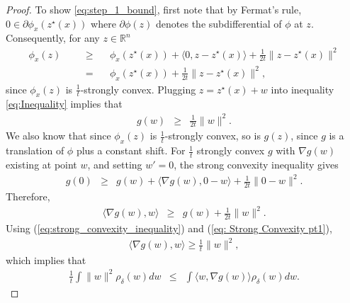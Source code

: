 \documentclass{article}
\newcommand{\Real}{\mathbb{R}}
\newcommand{\amp}{\mathop{\:\:\,}\nolimits}
\theoremstyle{plain}
\theoremstyle{definition}
\theoremstyle{remark}
\begin{document}
\begin{proof}
To show \eqref{eq:step_1_bound}, first note that by Fermat's rule, $0 \in \partial\phi_x(z^\star(x))$ where $\partial \phi(z)$ denotes the subdifferential of $\phi$ at $z$.
Consequently, for any $z \in \Real^n$
\begin{equation}
\label{eq:Inequality}
\begin{split}
    \phi_x(z) & \amp \geq \amp  \phi_x(z^\star(x)) + \langle 0, z - z^\star(x)\rangle + \frac{1}{2t}\|z-z^\star(x)\|^2 \\
    & \amp = \amp \phi_x(z^\star(x)) + \frac{1}{2t}\|z-z^\star(x)\|^2,
\end{split}
\end{equation}
since $\phi_x(z)$ is $\frac{1}{t}$-strongly convex. Plugging $z = z^\star(x) + w$ into inequality \eqref{eq:Inequality} implies that
\begin{eqnarray}
\label{eq:strong_convexity_inequality}
g(w) & \geq & \frac{1}{2t}\lVert w \rVert^2.
\end{eqnarray}
We also know that since $\phi_x(z)$ is $\frac{1}{t}$-strongly convex, so is $g(z)$, since $g$ is a translation of $\phi$ plus a constant shift. For $\frac{1}{t}$ strongly convex $g$ with $\nabla g(w)$ existing at point $w$, and setting $w' = 0$, the strong convexity inequality gives
\begin{eqnarray}
    g(0) & \geq &  g(w) + \langle \nabla g(w), 0 - w\rangle + \frac{1}{2t}\|0-w\|^2.
\end{eqnarray}
Therefore, 
\begin{eqnarray}\label{eq: Strong Convexity pt1}
    \langle  \nabla g(w), w\rangle &\geq& g(w) + \frac{1}{2t}\|w\|^2.
\end{eqnarray}
Using (\ref{eq:strong_convexity_inequality}) and (\ref{eq: Strong Convexity pt1}), 
\begin{eqnarray}
    \langle \nabla g(w), w \rangle \geq \frac{1}{t}\|w\|^2,
\end{eqnarray}
which implies that
\begin{eqnarray}
    \frac{1}{t}\int \lVert w \rVert^2 \rho_\delta(w)dw & \leq & \int \langle w,\nabla g(w)\rangle \rho_{\delta}(w)dw.
\end{eqnarray}


\end{proof}
\end{document}
